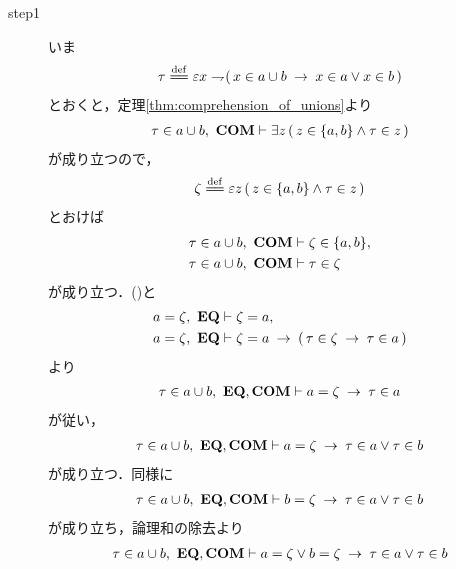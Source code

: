 	\begin{sketch}\mbox{}
		\begin{description}
			\item[step1]
				いま
				\begin{align}
					\tau \defeq \varepsilon x \negation 
					(\, x \in a \cup b \rarrow x \in a \vee x \in b\, )
				\end{align}
				とおくと，定理\ref{thm:comprehension_of_unions}より
				\begin{align}
					\tau \in a \cup b,\ \mbox{\bf COM} \vdash
					\exists z\, (\, z \in \{a,b\} \wedge \tau \in z\, )
				\end{align}
				が成り立つので，
				\begin{align}
					\zeta \defeq \varepsilon z\, 
					(\, z \in \{a,b\} \wedge \tau \in z\, )
				\end{align}
				とおけば
				\begin{align}
					\tau \in a \cup b,\ \mbox{\bf COM} &\vdash \zeta \in \{a,b\}, 
					\label{fom:union_of_pair_is_union_of_their_elements_1} \\
					\tau \in a \cup b,\ \mbox{\bf COM} &\vdash \tau \in \zeta
					\label{fom:union_of_pair_is_union_of_their_elements_2}
				\end{align}
				が成り立つ．()と
				\begin{align}
					a = \zeta,\ \mbox{{\bf EQ}} &\vdash \zeta = a, \\
					a = \zeta,\ \mbox{{\bf EQ}} &\vdash \zeta = a \hspace{0.25em}\rightarrow\hspace{0.25em}
					(\, \tau \in \zeta \hspace{0.25em}\rightarrow\hspace{0.25em} \tau \in a\, )
				\end{align}
				より
				\begin{align}
					\tau \in a \cup b,\ \mbox{{\bf EQ}},\mbox{\bf COM} \vdash
					a = \zeta \hspace{0.25em}\rightarrow\hspace{0.25em} \tau \in a 
				\end{align}
				が従い，
				\begin{align}
					\tau \in a \cup b,\ \mbox{{\bf EQ}},\mbox{\bf COM} \vdash
					a = \zeta \hspace{0.25em}\rightarrow\hspace{0.25em} \tau \in a \vee \tau \in b
				\end{align}
				が成り立つ．同様に
				\begin{align}
					\tau \in a \cup b,\ \mbox{{\bf EQ}},\mbox{\bf COM} \vdash
					b = \zeta \hspace{0.25em}\rightarrow\hspace{0.25em} \tau \in a \vee \tau \in b
				\end{align}
				が成り立ち，論理和の除去より
				\begin{align}
					\tau \in a \cup b,\ \mbox{{\bf EQ}},\mbox{\bf COM} \vdash
					a = \zeta \vee b = \zeta \hspace{0.25em}\rightarrow\hspace{0.25em} \tau \in a \vee \tau \in b
					\label{fom:union_of_pair_is_union_of_their_elements_3}
				\end{align}

\end{description}
\end{sketch}
